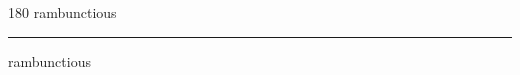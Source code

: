 
\begin{frame}
\begin{center}
\begin{turn}{180}
{\fontsize{2.5cm}{1em}\selectfont rambunctious}
\end{turn}
\vspace{1em}\par  
\hrule
\vspace{1em}\par  
{\fontsize{2.5cm}{1em}\selectfont rambunctious}
\end{center}
\end{frame}
